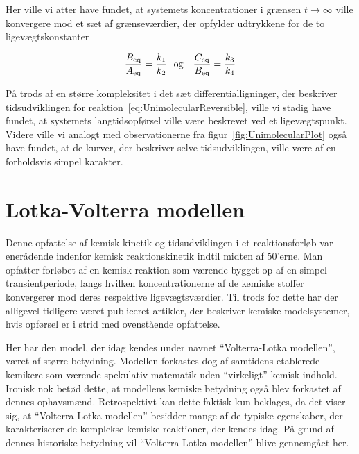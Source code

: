Her ville vi atter have fundet, at systemets
koncentrationer i gr{\ae}nsen \mbox{$t \rightarrow \infty$}
ville konvergere mod et s{\ae}t af gr{\ae}nsev{\ae}rdier,
der opfylder udtrykkene for de to ligev{\ae}gts\-konstanter

\begin{equation}
  \frac{B_{\rm eq}}{A_{\rm eq}} = \frac{k_1}{k_2} \mbox{\ \ og \ \ }
  \frac{C_{\rm eq}}{B_{\rm eq}} = \frac{k_3}{k_4}
  \label{eq:EquiConst}
\end{equation}

P{\aa} trods af en st{\o}rre kompleksitet i det s{\ae}t
differentiallig\-ninger, der be\-skri\-ver tidsudviklingen
for reaktion~\ref{eq:UnimolecularReversible}, ville vi
stadig have fundet, at systemets langtidsopf{\o}rsel ville
v{\ae}re beskrevet ved et ligev{\ae}gts\-punkt. Videre
ville vi analogt med observationerne fra
figur~\ref{fig:UnimolecularPlot} ogs{\aa} have fundet, at
de kurver, der beskriver selve tidsudviklingen, ville
v{\ae}re af en forholdsvis simpel karakter.

\section{Lotka-Volterra modellen}
\label{sec:LotkaSection}
Denne opfattelse af kemisk kinetik og tidsudviklingen i et
reaktions\-forl{\o}b var ener{\aa}dende indenfor kemisk
reaktionskinetik indtil midten af 50'erne. Man opfatter
forl{\o}bet af en kemisk reaktion som v{\ae}rende bygget op
af en simpel transientperiode, langs hvilken
koncentrationerne af de kemiske stoffer konvergerer mod
deres respektive ligev{\ae}gts\-v{\ae}rdier. Til trods for
dette har der alligevel tidligere v{\ae}ret publiceret
artikler, der beskriver kemiske modelsystemer, hvis
opf{\o}rsel er i strid med ovenst{\aa}ende opfattelse.

\vspace{4.0mm}
Her har den model, der idag kendes under navnet
``Volterra-Lotka modellen'', v{\ae}ret af st{\o}rre
betydning. Modellen forkastes dog af samtidens
eta\-ble\-rede kemi\-kere som v{\ae}rende spekulativ
matematik uden ``virkeligt'' kemisk indhold. Ironisk nok
bet{\o}d dette, at modellens kemiske betydning ogs{\aa}
blev forkastet af dennes ophavsm{\ae}nd. Retrospektivt kan
dette faktisk kun beklages, da det viser sig, at
``Volterra-Lotka modellen'' besidder mange af de typiske
egen\-skaber, der karakteriserer de komplekse kemiske
reaktioner, der kendes idag. P{\aa} grund af dennes
historiske betydning vil ``Volterra-Lotka modellen'' blive
gennemg{\aa}et her.

